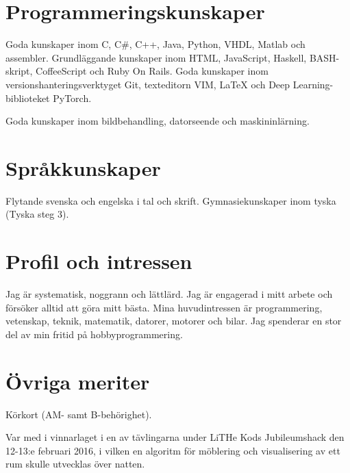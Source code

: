 \documentclass[a4paper,notitlepage]{article}
\begin{document}

\section*{Programmeringskunskaper}
Goda kunskaper inom C, C\#, C++, Java, Python, VHDL, Matlab och assembler.
Grundläggande kunskaper inom HTML, JavaScript, Haskell, BASH-skript,
CoffeeScript och Ruby On Rails. Goda kunskaper inom versionshanteringsverktyget
Git, texteditorn VIM, LaTeX och Deep Learning-biblioteket PyTorch.

Goda kunskaper inom bildbehandling, datorseende och maskininlärning.

\section*{Språkkunskaper}
Flytande svenska och engelska i tal och skrift. Gymnasiekunskaper inom tyska
(Tyska steg 3).

\section*{Profil och intressen}
Jag är systematisk, noggrann och lättlärd. Jag är engagerad i mitt arbete och
försöker alltid att göra mitt bästa. Mina huvudintressen är programmering, vetenskap, 
teknik, matematik, datorer, motorer och bilar. Jag spenderar en stor del av min fritid på
hobbyprogrammering.

\section*{Övriga meriter}
Körkort (AM- samt B-behörighet).

Var med i vinnarlaget i en av tävlingarna under LiTHe Kods Jubileumshack den
12-13:e februari 2016, i vilken en algoritm för möblering och visualisering av 
ett rum skulle utvecklas över natten.
\end{document}
